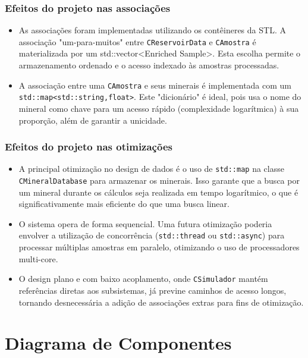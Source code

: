 \subsubsection*{Efeitos do projeto nas associações}
\begin{itemize}
    \item As associações foram implementadas utilizando os contêineres da STL. A associação "um-para-muitos" entre \texttt{CReservoirData} e \texttt{CAmostra} é materializada por um std::vector<Enriched Sample>. Esta escolha permite o armazenamento ordenado e o acesso indexado às amostras processadas.
    
    \item A associação entre uma \texttt{CAmostra} e seus minerais é implementada com um \texttt{std::map\allowbreak<\allowbreak std::string,\allowbreak float\allowbreak>}. Este "dicionário" é ideal, pois usa o nome do mineral como chave para um acesso rápido (complexidade logarítmica) à sua proporção, além de garantir a unicidade.
\end{itemize}

\subsubsection*{Efeitos do projeto nas otimizações}
\begin{itemize}
    \item A principal otimização no design de dados é o uso de \texttt{std::map} na classe \texttt{CMineralDatabase} para armazenar os minerais. Isso garante que a busca por um mineral durante os cálculos seja realizada em tempo logarítmico, o que é significativamente mais eficiente do que uma busca linear.
    
    \item O sistema opera de forma sequencial. Uma futura otimização poderia envolver a utilização de concorrência (\texttt{std::thread} ou \texttt{std::async}) para processar múltiplas amostras em paralelo, otimizando o uso de processadores multi-core.
    
    \item O design plano e com baixo acoplamento, onde \texttt{CSimulador} mantém referências diretas aos subsistemas, já previne caminhos de acesso longos, tornando desnecessária a adição de associações extras para fins de otimização.
\end{itemize}

\section{Diagrama de Componentes\label{sec:Diagrama-de-componentes}}


